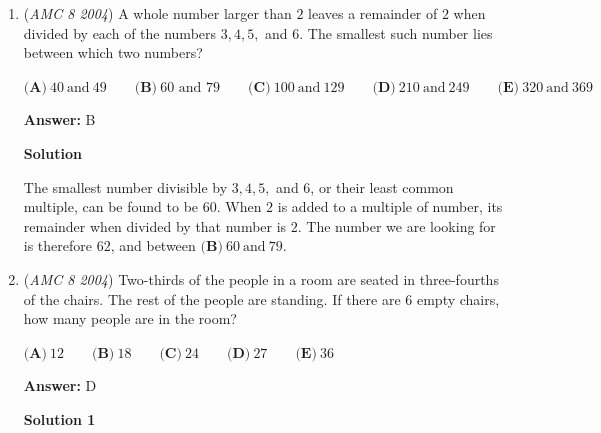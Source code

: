 \begin{enumerate}
The only way to get Ben's score is with $1+3=4$. Cindy's score can be made of $3+4$ or $2+5$, but since Ben already hit the $3$, Cindy hit $2+5=7$. Similarly, Dave's darts were in the region $4+7=11$. Lastly, because there is no $7$ left, $\boxed{\textbf{(A)}\ \text{Alice}}$ must have hit the regions $6+10=16$ and Ellen $8+9=17$.

 



\textbf{Solution 2}

Taking the 2 largest scores to narrow out the points we get

 Ellen with either $10,7$ or $9,8$ and Alice with either $10,6$ or $9,7$, the 2 pairs that work areAlice=$10,6$Ellen=$9,8$, therefore Alice scored the $6$.

 This way, we don’t need to check anyway if anyone else got $6$.

 


	\item (\textit{AMC 8 2004}) A whole number larger than $2$ leaves a remainder of $2$ when divided by each of the numbers $3, 4, 5,$ and $6$. The smallest such number lies between which two numbers?


 $\textbf{(A)}\ 40\ \text{and}\ 49 \qquad \textbf{(B)}\ 60 \text{ and } 79 \qquad \textbf{(C)}\ 100\ \text{and}\ 129 \qquad \textbf{(D)}\ 210\ \text{and}\ 249\qquad \textbf{(E)}\ 320\ \text{and}\ 369$

 \textbf{Answer: }B



\textbf{Solution}

The smallest number divisible by $3,4,5,$ and $6$, or their least common multiple, can be found to be $60$. When $2$ is added to a multiple of number, its remainder when divided by that number is $2$. The number we are looking for is therefore $62$, and between $\boxed{\textbf{(B)}\ 60\ \text{and}\ 79}$.

 


	\item (\textit{AMC 8 2004}) Two-thirds of the people in a room are seated in three-fourths of the chairs. The rest of the people are standing. If there are $6$ empty chairs, how many people are in the room?


 $\textbf{(A)}\ 12\qquad \textbf{(B)}\ 18\qquad \textbf{(C)}\ 24\qquad \textbf{(D)}\ 27\qquad \textbf{(E)}\ 36$

 \textbf{Answer: }D



\textbf{Solution 1}


\end{enumerate}
